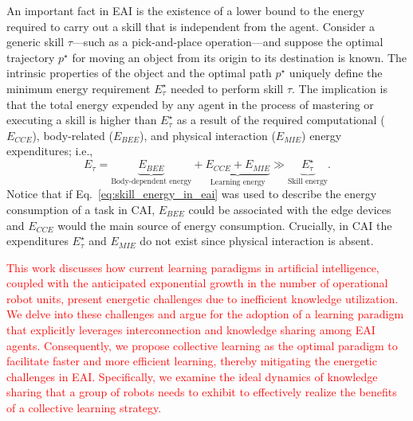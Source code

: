 \documentclass[12pt]{article}
\newcommand{\redtext}[1]{\textcolor{red}{#1}}
\begin{document}
An important fact in EAI is the existence of a lower bound to the energy required to carry out a skill that is independent from the agent. Consider a generic skill $\tau$---such as a pick-and-place operation---and suppose the optimal trajectory $p^\star$ for moving an object from its origin to its destination is known. The intrinsic properties of the object and the optimal path $p^\star$ uniquely define the minimum energy requirement $E^\star_{\tau}$ needed to perform skill $\tau$. The implication is that the total energy expended by any agent in the process of mastering or executing a skill is higher than $E^\star_{\tau}$ as a result of the required computational ($E_{CCE}$), body-related ($E_{BEE}$), and physical interaction ($E_{MIE}$) energy expenditures; i.e.,
\begin{equation}\label{eq:skill_energy_in_eai}
	E_{\tau} =  \underbrace{E_{BEE}}_{\text{Body-dependent energy}} + \underbrace{E_{CCE} + E_{MIE}}_{\text{Learning energy}} \gg \underbrace{E^\star_{\tau}}_{\text{Skill energy}} .
\end{equation}
Notice that if Eq.~\eqref{eq:skill_energy_in_eai} was used to describe the energy consumption of a task in CAI, $E_{BEE}$ could be associated with the edge devices and $E_{CCE}$ would the main source of energy consumption. Crucially, in CAI the expenditures $E^\star_{\tau}$ and $E_{MIE}$ do not exist since physical interaction is absent.

\redtext{This work discusses how current learning paradigms in artificial intelligence, coupled with the anticipated exponential growth in the number of operational robot units, present energetic challenges due to inefficient knowledge utilization. We delve into these challenges and argue for the adoption of a learning paradigm that explicitly leverages interconnection and knowledge sharing among EAI agents. Consequently, we propose collective learning as the optimal paradigm to facilitate faster and more efficient learning, thereby mitigating the energetic challenges in EAI. Specifically, we examine the ideal dynamics of knowledge sharing that a group of robots needs to exhibit to effectively realize the benefits of a collective learning strategy.}


\end{document}
